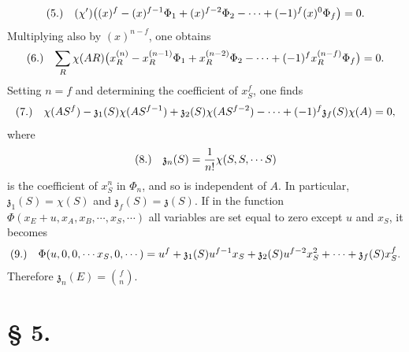 \documentclass[11pt]{article}
\makeatletter
\newcommand{\frobtag}[2]{\[\begin{array}{@{}r@{\quad}l@{}}\textup{(#1)} & \displaystyle #2\end{array}\]}
\newcommand{\frobtagc}[2]{\[\begin{array}{@{}r@{\quad}c@{}}\textup{(#1)} & \displaystyle #2\end{array}\]}
\makeatother
\begin{document}
\frobtag{5.}{(\chi')\bigl((x)^f-(x)^{f-1}\Phi_1+(x)^{f-2}\Phi_2-\cdots+(-1)^f(x)^0\Phi_f\bigr)=0.}
Multiplying also by $(x)^{n-f}$, one obtains
\frobtag{6.}{\sum_R\chi(AR)\bigl(x_R^{(n)}-x_R^{(n-1)}\Phi_1+x_R^{(n-2)}\Phi_2-\cdots+(-1)^f x_R^{(n-f)}\Phi_f\bigr)=0.}
Setting $n=f$ and determining the coefficient of $x_S^f$, one finds
\frobtag{7.}{\chi(AS^f)-\mathfrak{z}_1(S)\chi(AS^{f-1})+\mathfrak{z}_2(S)\chi(AS^{f-2})-\cdots+(-1)^f\mathfrak{z}_f(S)\chi(A)=0,}
where
\frobtagc{8.}{\mathfrak{z}_n(S)=\frac{1}{n!}\chi(S,S,\cdots S)}
is the coefficient of $x_S^n$ in $\Phi_n$, and so is independent of $A$. In particular, $\mathfrak{z}_1(S)=\chi(S)$ and $\mathfrak{z}_f(S)=\mathfrak{z}(S)$. If in the function $\Phi(x_E+u,x_A,x_B,\cdots,x_S,\cdots)$ all variables are set equal to zero except $u$ and $x_S$, it becomes
\frobtag{9.}{\Phi(u,0,0,\cdots x_S,0,\cdots)=u^f+\mathfrak{z}_1(S)u^{f-1}x_S+\mathfrak{z}_2(S)u^{f-2}x_S^2+\cdots+\mathfrak{z}_f(S)x_S^f.}
Therefore $\mathfrak{z}_n(E)=\binom{f}{n}$.

\section*{§ 5.}
\end{document}
